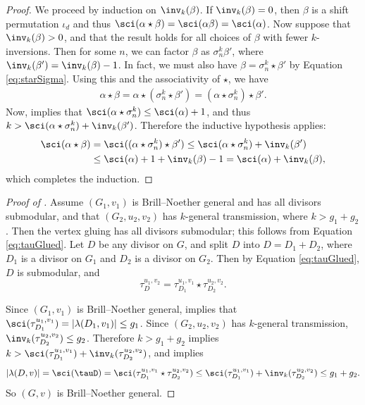 \begin{proof}
We proceed by induction on $\inv_k(\beta)$. If $\inv_k(\beta) = 0$, then $\beta$ is a shift permutation $\iota_d$ and thus $\sci(\alpha\star \beta) = \sci(\alpha\beta) = \sci(\alpha)$.
Now suppose that $\inv_k(\beta) >0$, and that the result holds for all choices of $\beta$ with fewer $k$-inversions.
Then for some $n$, we can factor $\beta$ as $\sigma^k_n \beta'$, where $\inv_k(\beta') = \inv_k(\beta)-1$. In fact, we must also have $\beta = \sigma^k_n \star \beta'$ by Equation \eqref{eq:starSigma}.
Using this and the associativity of $\star$, we have
\begin{align*}
    \alpha \star \beta = \alpha \star (\sigma_n^k \star \beta') = (\alpha \star \sigma_n^k) \star \beta'.
\end{align*}
Now,  implies that $\sci(\alpha \star \sigma^k_n) \leq \sci(\alpha)+1$, and thus $k > \sci(\alpha \star \sigma^k_n) + \inv_k(\beta')$. Therefore the inductive hypothesis applies:
\begin{align*}
    \sci(\alpha \star \beta) &= \sci((\alpha \star \sigma_n^k) \star \beta') \leq \sci(\alpha \star \sigma_n^k) + \inv_k(\beta') \\&\leq \sci(\alpha) + 1 + \inv_k(\beta) -1 = \sci(\alpha) + \inv_k(\beta),
\end{align*}
which completes the induction.
\end{proof}

\begin{proof}[Proof of ]
Assume $(G_1, v_1)$ is Brill--Noether general and has all divisors submodular, and that $(G_2, u_2, v_2)$ has $k$-general transmission, where $k > g_1 + g_2$. 
Then the vertex gluing has all divisors submodular; this follows from Equation \eqref{eq:tauGlued}. 
Let $D$ be any divisor on $G$, and split $D$ into $D = D_1 + D_2$, where $D_1$ is a divisor on $G_1$ and $D_2$ is a divisor on $G_2$. Then by Equation \eqref{eq:tauGlued}, $D$ is submodular, and
$$\tau_D^{u_1,v_2} = \tau_{D_1}^{u_1, v_1} \star \tau_{D_2}^{u_2,v_2}.$$

Since $(G_1, v_1)$ is Brill--Noether general,  implies that $\sci(\tau_{D_1}^{u_1, v_1}) = |\lambda(D_1, v_1)| \leq g_1$. Since $(G_2, u_2, v_2)$ has $k$-general transmission, $\inv_k(\tau_{D_2}^{u_2,v_2}) \leq g_2$. Therefore $k > g_1 + g_2$ implies $k > \sci(\tau_{D_1}^{u_1,v_1}) + \inv_k(\tau_{D_2}^{u_2,v_2})$, and  implies
$$ |\lambda(D,v)| = \sci(\tauD) = \sci(\tau_{D_1}^{u_1,v_1} \star \tau_{D_2}^{u_2,v_2}) \leq \sci(\tau_{D_1}^{u_1,v_1}) + \inv_k(\tau_{D_2}^{u_2,v_2}) \leq g_1 + g_2.$$
So $(G,v)$ is Brill--Noether general.
\end{proof}

